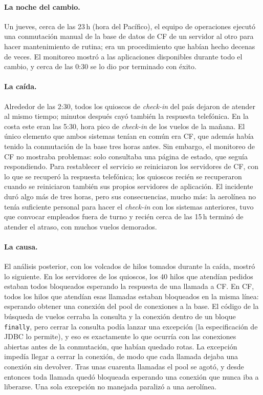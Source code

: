 \documentclass[variant=apuntes,cover=institutional,mode=screen]{ua-engineering-v6-article}
\begin{document}
\paragraph{La noche del cambio.} Un jueves, cerca de las 23\,h (hora del Pacífico), el equipo de operaciones ejecutó una conmutación manual de la base de datos de CF de un servidor al otro para hacer mantenimiento de rutina; era un procedimiento que habían hecho decenas de veces. El monitoreo mostró a las aplicaciones disponibles durante todo el cambio, y cerca de las 0:30 se lo dio por terminado con éxito.

\paragraph{La caída.} Alrededor de las 2:30, todos los quioscos de \emph{check-in} del país dejaron de atender al mismo tiempo; minutos después cayó también la respuesta telefónica. En la costa este eran las 5:30, hora pico de \emph{check-in} de los vuelos de la mañana. El único elemento que ambos sistemas tenían en común era CF, que además había tenido la conmutación de la base tres horas antes. Sin embargo, el monitoreo de CF no mostraba problemas: solo consultaba una página de estado, que seguía respondiendo. Para restablecer el servicio se reiniciaron los servidores de CF, con lo que se recuperó la respuesta telefónica; los quioscos recién se recuperaron cuando se reiniciaron también sus propios servidores de aplicación. El incidente duró algo más de tres horas, pero sus consecuencias, mucho más: la aerolínea no tenía suficiente personal para hacer el \emph{check-in} con los sistemas anteriores, tuvo que convocar empleados fuera de turno y recién cerca de las 15\,h terminó de atender el atraso, con muchos vuelos demorados.

\paragraph{La causa.} El análisis posterior, con los volcados de hilos tomados durante la caída, mostró lo siguiente. En los servidores de los quioscos, los 40 hilos que atendían pedidos estaban todos bloqueados esperando la respuesta de una llamada a CF. En CF, todos los hilos que atendían esas llamadas estaban bloqueados en la misma línea: esperando obtener una conexión del pool de conexiones a la base. El código de la búsqueda de vuelos cerraba la consulta y la conexión dentro de un bloque \texttt{finally}, pero cerrar la consulta podía lanzar una excepción (la especificación de JDBC lo permite), y eso es exactamente lo que ocurría con las conexiones abiertas antes de la conmutación, que habían quedado rotas. La excepción impedía llegar a cerrar la conexión, de modo que cada llamada dejaba una conexión sin devolver. Tras unas cuarenta llamadas el pool se agotó, y desde entonces toda llamada quedó bloqueada esperando una conexión que nunca iba a liberarse. Una sola excepción no manejada paralizó a una aerolínea.
\end{document}
